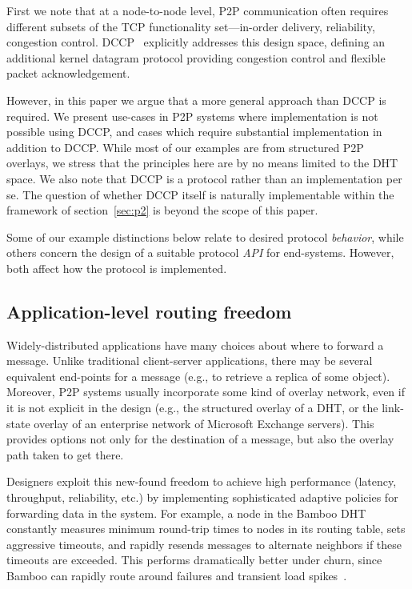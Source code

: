 First we note that at a node-to-node level, P2P
communication often requires different subsets of the TCP
functionality set---in-order delivery, reliability, congestion
control. 
DCCP~\cite{dccp-problem} explicitly addresses this design space,
defining an additional kernel datagram protocol providing
congestion control and flexible packet acknowledgement. 

However, in this paper we argue that a more general approach than DCCP
is required.  We present use-cases in P2P systems where
implementation is not possible using DCCP, and cases which
require substantial implementation in addition to DCCP.   While most
of our examples are from structured P2P overlays, we stress that the
principles here are by no means limited to the DHT space. 
We also note that DCCP is a protocol rather than an
implementation per se.  The question of whether DCCP itself is
naturally implementable within the framework of section~\ref{sec:p2}
is beyond the scope of this paper.

Some of our example distinctions below relate to desired protocol
\emph{behavior}, while others concern the design of a suitable protocol
\emph{API} for end-systems.  However, both affect how the protocol is implemented.

\subsection{Application-level routing freedom}
\label{sec:routingFreedom}

Widely-distributed applications have many choices about
where to forward a message.  Unlike traditional client-server
applications, there may be several equivalent end-points for a message 
(e.g., to retrieve a replica of some object).  
Moreover, P2P systems usually incorporate some kind of overlay
network, even if it is not explicit in the
design (e.g., the structured overlay of a DHT, or the
link-state overlay of an enterprise network of Microsoft
Exchange servers).  This provides options not only for the
destination of a message, but also the overlay path taken to get
there.

Designers exploit this new-found freedom to achieve high performance
(latency, throughput, reliability, etc.) by implementing
sophisticated adaptive policies for forwarding data in the system.  For
example, a node in the Bamboo DHT~\cite{rhea_usenix_2004} constantly
measures minimum round-trip times to nodes in its routing table, sets
aggressive timeouts, and rapidly resends messages to alternate
neighbors if these timeouts are exceeded.   This performs
dramatically better under churn, since Bamboo can rapidly route 
around failures and transient load spikes~\cite{rhea_usenix_2004}. 

